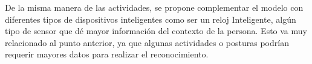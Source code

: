 De la misma manera de las actividades, se propone complementar el modelo con diferentes tipos de dispositivos inteligentes como ser un reloj Inteligente, algún tipo de sensor que dé mayor información del contexto de la persona. Esto va muy relacionado al punto anterior, ya que algunas actividades o posturas podrían requerir mayores datos para realizar el reconocimiento.








